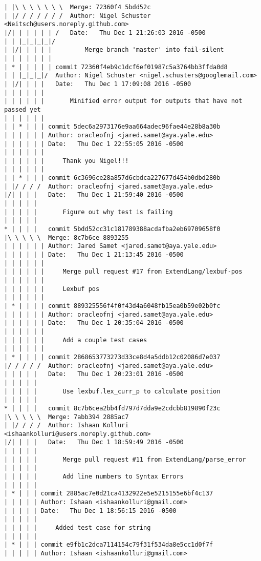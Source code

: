 \begin{lstlisting}
| |\ \ \ \ \ \ \  Merge: 72360f4 5bdd52c
| |/ / / / / / /  Author: Nigel Schuster <Neitsch@users.noreply.github.com>
|/| | | | | | /   Date:   Thu Dec 1 21:26:03 2016 -0500
| | |_|_|_|_|/    
| |/| | | | |         Merge branch 'master' into fail-silent
| | | | | | |        
| * | | | | | commit 72360f4eb9c1dcf6ef01987c5a3764bb3ffda0d8
| | |_|_|_|/  Author: Nigel Schuster <nigel.schusters@googlemail.com>
| |/| | | |   Date:   Thu Dec 1 17:09:08 2016 -0500
| | | | | |   
| | | | | |       Minified error output for outputs that have not passed yet
| | | | | |       
| | * | | | commit 5dec6a2973176e9aa664adec96fae44e28b8a30b
| | | | | | Author: oracleofnj <jared.samet@aya.yale.edu>
| | | | | | Date:   Thu Dec 1 22:55:05 2016 -0500
| | | | | | 
| | | | | |     Thank you Nigel!!!
| | | | | |       
| | * | | | commit 6c3696ce28a857d6cbdca227677d454b0dbd280b
| |/ / / /  Author: oracleofnj <jared.samet@aya.yale.edu>
|/| | | |   Date:   Thu Dec 1 21:59:40 2016 -0500
| | | | |   
| | | | |       Figure out why test is failing
| | | | |        
* | | | |   commit 5bdd52cc31c181789388acdafba2eb69709658f0
|\ \ \ \ \  Merge: 8c7b6ce 8893255
| | | | | | Author: Jared Samet <jared.samet@aya.yale.edu>
| | | | | | Date:   Thu Dec 1 21:13:45 2016 -0500
| | | | | | 
| | | | | |     Merge pull request #17 from ExtendLang/lexbuf-pos
| | | | | |     
| | | | | |     Lexbuf pos
| | | | | |       
| * | | | | commit 889325556f4f0f43d4a6048fb15ea0b59e02b0fc
| | | | | | Author: oracleofnj <jared.samet@aya.yale.edu>
| | | | | | Date:   Thu Dec 1 20:35:04 2016 -0500
| | | | | | 
| | | | | |     Add a couple test cases
| | | | | |       
| * | | | | commit 2868653773273d33ce8d4a5ddb12c02086d7e037
|/ / / / /  Author: oracleofnj <jared.samet@aya.yale.edu>
| | | | |   Date:   Thu Dec 1 20:23:01 2016 -0500
| | | | |   
| | | | |       Use lexbuf.lex_curr_p to calculate position
| | | | |        
* | | | |   commit 8c7b6cea2bb4fd797d7dda9e2cdcbb819890f23c
|\ \ \ \ \  Merge: 7abb394 2885ac7
| |/ / / /  Author: Ishaan Kolluri <ishaankolluri@users.noreply.github.com>
|/| | | |   Date:   Thu Dec 1 18:59:49 2016 -0500
| | | | |   
| | | | |       Merge pull request #11 from ExtendLang/parse_error
| | | | |       
| | | | |       Add line numbers to Syntax Errors
| | | | |      
| * | | | commit 2885ac7e0d21ca4132922e5e5215155e6bf4c137
| | | | | Author: Ishaan <ishaankolluri@gmail.com>
| | | | | Date:   Thu Dec 1 18:56:15 2016 -0500
| | | | | 
| | | | |     Added test case for string
| | | | |      
| * | | | commit e9fb1c2dca7114154c79f31f534da8e5cc1d0f7f
| | | | | Author: Ishaan <ishaankolluri@gmail.com>

\end{lstlisting}
